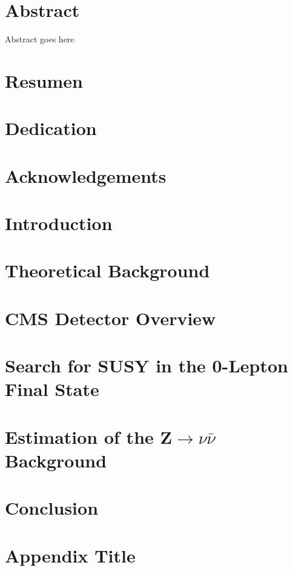 \documentclass[12pt,twoside,openany]{book}
\begin{document}


\frontmatter
\chapter*{Abstract}
Abstract goes here
\chapter*{Resumen}
\chapter*{Dedication}
\chapter*{Acknowledgements}
\tableofcontents

\mainmatter
\chapter{Introduction}


\chapter{Theoretical Background}


\chapter{CMS Detector Overview}


\chapter{Search for SUSY in the 0-Lepton Final State}\label{AnalysisChap}


\chapter{Estimation of the Z$\rightarrow \nu\bar{\nu}$ Background}


\chapter{Conclusion}


\appendix
\chapter{Appendix Title}


{}

\end{document}
